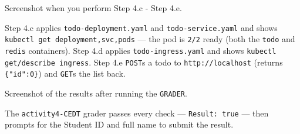 \documentclass[a4paper, 10pt]{article}
\begin{document}
\begin{problem}
Screenshot when you perform Step 4.c - Step 4.e.
\end{problem}

\begin{solution}
	Step 4.c applies \texttt{todo-deployment.yaml} and \texttt{todo-service.yaml} and shows
	\texttt{kubectl get deployment,svc,pods} --- the pod is \texttt{2/2} ready (both the
	\texttt{todo} and \texttt{redis} containers). Step 4.d applies \texttt{todo-ingress.yaml}
	and shows \texttt{kubectl get/describe ingress}. Step 4.e \texttt{POST}s a todo to
	\texttt{http://localhost} (returns \texttt{\{"id":0\}}) and \texttt{GET}s the list back.

\end{solution}

\begin{problem}
Screenshot of the results after running the \texttt{GRADER}.
\end{problem}

\begin{solution}
	The \texttt{activity4-CEDT} grader passes every check --- \texttt{Result: true} ---
	then prompts for the Student ID and full name to submit the result.

\end{solution}
\end{document}
